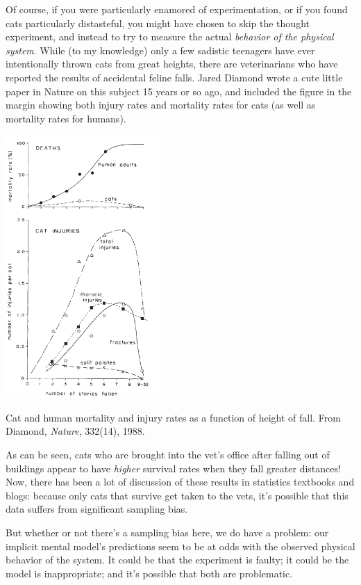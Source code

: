 Of course, if you were particularly enamored of experimentation, or if you found cats particularly distasteful, you might have chosen to skip the thought experiment, and instead to try to measure the actual {\it behavior of the physical system}.  While (to my knowledge) only a few sadistic teenagers have ever intentionally thrown cats from great heights, there are veterinarians who have reported the results of accidental feline falls.  Jared Diamond wrote a cute little paper in Nature on this subject 15 years or so ago, and included the figure in the margin showing both injury rates and mortality rates for cats (as well as mortality rates for humans). 
\begin{marginfigure}
\includegraphics[height=10cm]{figs/DiamondFigure}

Cat and human mortality and injury rates as a function of height of fall.  From Diamond, {\it Nature}, 332(14), 1988.
\end{marginfigure}

As can be seen, cats who are brought into the vet's office after falling out of buildings appear to have {\it higher} survival rates when they fall greater distances! Now, there has been a lot of discussion of these results in statistics textbooks and blogs: because only cats that survive get taken to the vets, it's possible that this data suffers from significant sampling bias.  

But whether or not there's a sampling bias here, we do have a problem:  our implicit mental model's predictions seem to be at odds with the observed physical behavior of the system.  It could be that the experiment is faulty; it could be the model is inappropriate; and it's possible that both are problematic.  

